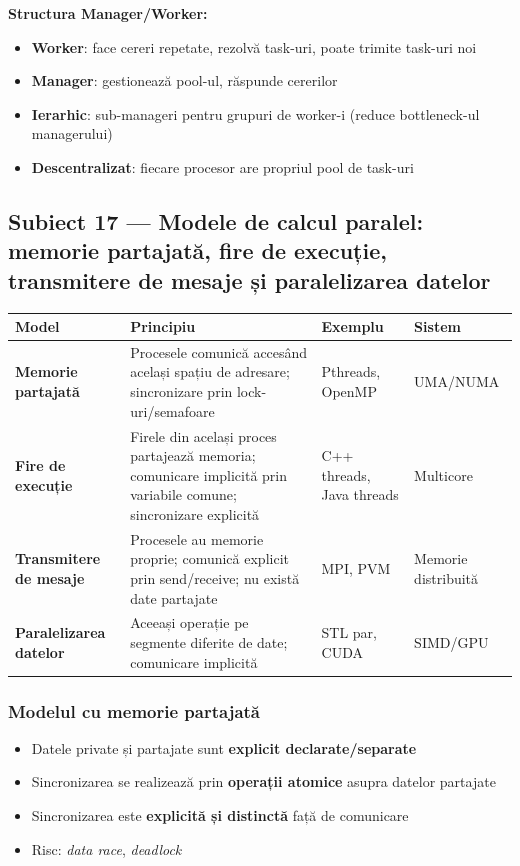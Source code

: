 \documentclass[a4paper,11pt]{article}
\newcommand{\thead}[1]{\cellcolor{tblh}\color{white}\textbf{#1}}
\newcommand{\subiect}[2]{\subsection{Subiect \textcolor{numcol}{#1} — #2}}
\begin{document}
\textbf{Structura Manager/Worker:}
\begin{itemize}[noitemsep]
  \item \textbf{Worker}: face cereri repetate, rezolvă task-uri, poate trimite task-uri noi
  \item \textbf{Manager}: gestionează pool-ul, răspunde cererilor
  \item \textbf{Ierarhic}: sub-manageri pentru grupuri de worker-i (reduce bottleneck-ul managerului)
  \item \textbf{Descentralizat}: fiecare procesor are propriul pool de task-uri
\end{itemize}

\subiect{17}{Modele de calcul paralel: memorie partajată, fire de execuție, transmitere de mesaje și paralelizarea datelor}

\begin{center}
\begin{tabularx}{\textwidth}{lXll}
\toprule
\thead{Model} & \thead{Principiu} & \thead{Exemplu} & \thead{Sistem} \\
\midrule
\textbf{Memorie partajată} & Procesele comunică accesând același spațiu de adresare; sincronizare prin lock-uri/semafoare & Pthreads, OpenMP & UMA/NUMA \\
\addlinespace
\textbf{Fire de execuție} & Firele din același proces partajează memoria; comunicare implicită prin variabile comune; sincronizare explicită & C++ threads, Java threads & Multicore \\
\addlinespace
\textbf{Transmitere de mesaje} & Procesele au memorie proprie; comunică explicit prin send/receive; nu există date partajate & MPI, PVM & Memorie distribuită \\
\addlinespace
\textbf{Paralelizarea datelor} & Aceeași operație pe segmente diferite de date; comunicare implicită & STL par, CUDA & SIMD/GPU \\
\bottomrule
\end{tabularx}
\end{center}

\subsubsection{Modelul cu memorie partajată}
\begin{itemize}[noitemsep]
  \item Datele private și partajate sunt \textbf{explicit declarate/separate}
  \item Sincronizarea se realizează prin \textbf{operații atomice} asupra datelor partajate
  \item Sincronizarea este \textbf{explicită și distinctă} față de comunicare
  \item Risc: \emph{data race}, \emph{deadlock}
\end{itemize}
\end{document}
